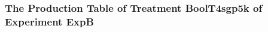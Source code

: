  \begin{frame}
 \fontsize{8pt}{9pt}\selectfont
 \frametitle{ The Production Table of Treatment BoolT4sgp5k of Experiment ExpB }

 \label{ExpBGrammarTable030.tex}  
 \end{frame}

